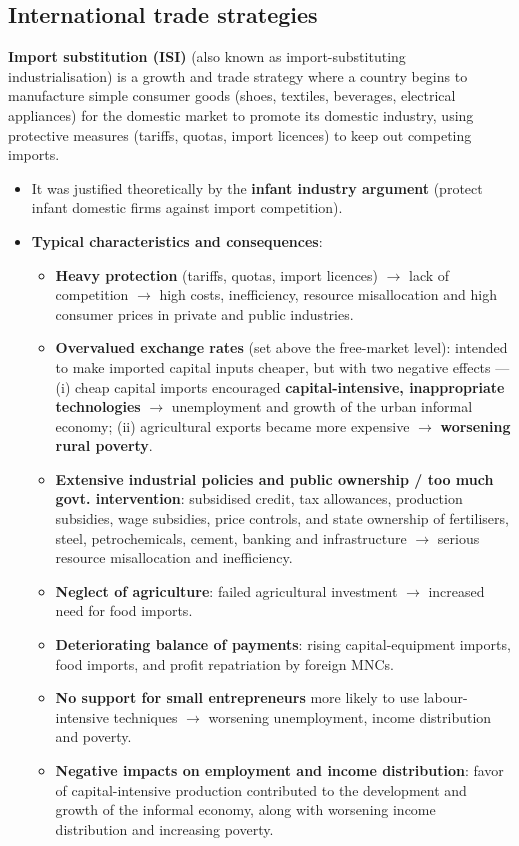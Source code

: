 \documentclass[a4paper,12pt]{article}
\newcommand{\needbold}[1]{\textcolor{red!70!black}{\textbf{#1}}}
\begin{document}
\subsection{International trade strategies}
\needbold{Import substitution (ISI)} (also known as import-substituting industrialisation) is a growth and trade strategy where a country begins to manufacture simple consumer goods (shoes, textiles, beverages, electrical appliances) for the domestic market to promote its domestic industry, using protective measures (tariffs, quotas, import licences) to keep out competing imports.
\begin{itemize}
  \item It was justified theoretically by the \textbf{infant industry argument} (protect infant domestic firms against import competition).
  \item \textbf{Typical characteristics and consequences}:
  \begin{itemize}
    \item \textbf{Heavy protection} (tariffs, quotas, import licences) $\to$ lack of competition $\to$ high costs, inefficiency, resource misallocation and high consumer prices in private and public industries.
    \item \textbf{Overvalued exchange rates} (set above the free-market level): intended to make imported capital inputs cheaper, but with two negative effects --- (i) cheap capital imports encouraged \textbf{capital-intensive, inappropriate technologies} $\to$ unemployment and growth of the urban informal economy; (ii) agricultural exports became more expensive $\to$ \textbf{worsening rural poverty}.
    \item \textbf{Extensive industrial policies and public ownership / too much govt. intervention}: subsidised credit, tax allowances, production subsidies, wage subsidies, price controls, and state ownership of fertilisers, steel, petrochemicals, cement, banking and infrastructure $\to$ serious resource misallocation and inefficiency.
    \item \textbf{Neglect of agriculture}: failed agricultural investment $\to$ increased need for food imports.
    \item \textbf{Deteriorating balance of payments}: rising capital-equipment imports, food imports, and profit repatriation by foreign MNCs.
    \item \textbf{No support for small entrepreneurs} more likely to use labour-intensive techniques $\to$ worsening unemployment, income distribution and poverty.
    \item \textbf{Negative impacts on employment and income distribution}: favor of capital-intensive production contributed to the development and growth of the informal economy, along with worsening income distribution and increasing poverty.

\end{itemize}
\end{itemize}
\end{document}
